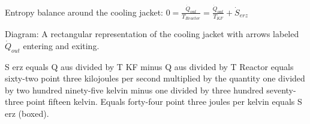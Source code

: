 Entropy balance around the cooling jacket:  
\( 0 = \frac{\dot{Q}_{out}}{T_{Reactor}} = \frac{\dot{Q}_{out}}{T_{KF}} + \dot{S}_{erz} \)  

Diagram: A rectangular representation of the cooling jacket with arrows labeled \( \dot{Q}_{out} \) entering and exiting.

S erz equals Q aus divided by T KF minus Q aus divided by T Reactor equals sixty-two point three kilojoules per second multiplied by the quantity one divided by two hundred ninety-five kelvin minus one divided by three hundred seventy-three point fifteen kelvin.  
Equals forty-four point three joules per kelvin equals S erz (boxed).